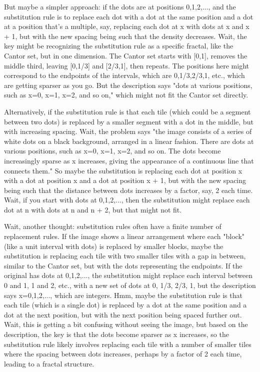 But maybe a simpler approach: if the dots are at positions 0,1,2,..., and the substitution rule is to replace each dot with a dot at the same position and a dot at a position that's a multiple, say, replacing each dot at x with dots at x and x + 1, but with the new spacing being such that the density decreases. Wait, the key might be recognizing the substitution rule as a specific fractal, like the Cantor set, but in one dimension. The Cantor set starts with [0,1], removes the middle third, leaving [0,1/3] and [2/3,1], then repeats. The positions here might correspond to the endpoints of the intervals, which are 0,1/3,2/3,1, etc., which are getting sparser as you go. But the description says "dots at various positions, such as x=0, x=1, x=2, and so on," which might not fit the Cantor set directly. 

Alternatively, if the substitution rule is that each tile (which could be a segment between two dots) is replaced by a smaller segment with a dot in the middle, but with increasing spacing. Wait, the problem says "the image consists of a series of white dots on a black background, arranged in a linear fashion. There are dots at various positions, such as x=0, x=1, x=2, and so on. The dots become increasingly sparse as x increases, giving the appearance of a continuous line that connects them." So maybe the substitution is replacing each dot at position x with a dot at position x and a dot at position x + 1, but with the new spacing being such that the distance between dots increases by a factor, say, 2 each time. Wait, if you start with dots at 0,1,2,..., then the substitution might replace each dot at n with dots at n and n + 2, but that might not fit. 

Wait, another thought: substitution rules often have a finite number of replacement rules. If the image shows a linear arrangement where each "block" (like a unit interval with dots) is replaced by smaller blocks, maybe the substitution is replacing each tile with two smaller tiles with a gap in between, similar to the Cantor set, but with the dots representing the endpoints. If the original has dots at 0,1,2,..., the substitution might replace each interval between 0 and 1, 1 and 2, etc., with a new set of dots at 0, 1/3, 2/3, 1, but the description says x=0,1,2,..., which are integers. Hmm, maybe the substitution rule is that each tile (which is a single dot) is replaced by a dot at the same position and a dot at the next position, but with the next position being spaced further out. Wait, this is getting a bit confusing without seeing the image, but based on the description, the key is that the dots become sparser as x increases, so the substitution rule likely involves replacing each tile with a number of smaller tiles where the spacing between dots increases, perhaps by a factor of 2 each time, leading to a fractal structure. 

